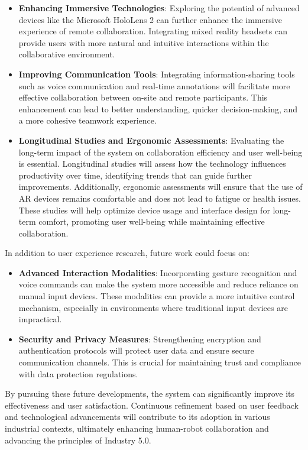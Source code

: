 \begin{itemize}
    \item \textbf{Enhancing Immersive Technologies}: Exploring the potential of advanced devices like the Microsoft HoloLens 2 can further enhance the immersive experience of remote collaboration. Integrating mixed reality headsets can provide users with more natural and intuitive interactions within the collaborative environment.
    \item \textbf{Improving Communication Tools}: Integrating information-sharing tools such as voice communication and real-time annotations will facilitate more effective collaboration between on-site and remote participants. This enhancement can lead to better understanding, quicker decision-making, and a more cohesive teamwork experience.
    \item \textbf{Longitudinal Studies and Ergonomic Assessments}: Evaluating the long-term impact of the system on collaboration efficiency and user well-being is essential. Longitudinal studies will assess how the technology influences productivity over time, identifying trends that can guide further improvements. Additionally, ergonomic assessments will ensure that the use of \ac{AR} devices remains comfortable and does not lead to fatigue or health issues. These studies will help optimize device usage and interface design for long-term comfort, promoting user well-being while maintaining effective collaboration.
\end{itemize}

In addition to user experience research, future work could focus on:

\begin{itemize} 

    \item \textbf{Advanced Interaction Modalities}: Incorporating gesture recognition and voice commands can make the system more accessible and reduce reliance on manual input devices. These modalities can provide a more intuitive control mechanism, especially in environments where traditional input devices are impractical.
    
    \item \textbf{Security and Privacy Measures}: Strengthening encryption and authentication protocols will protect user data and ensure secure communication channels. This is crucial for maintaining trust and compliance with data protection regulations.
\end{itemize}

By pursuing these future developments, the system can significantly improve its effectiveness and user satisfaction. Continuous refinement based on user feedback and technological advancements will contribute to its adoption in various industrial contexts, ultimately enhancing human-robot collaboration and advancing the principles of Industry 5.0.

